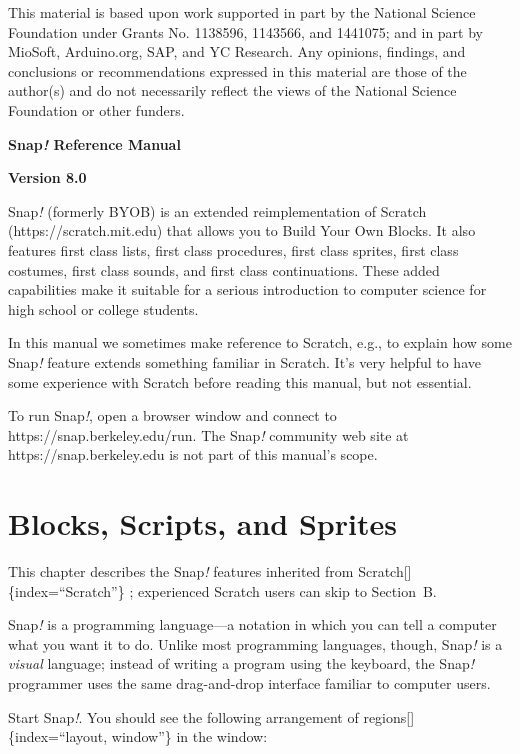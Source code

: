 \documentclass[
  letterpaper,
]{book}
\begin{document}
This material is based upon work supported in part by the National
Science Foundation under Grants No. 1138596, 1143566, and 1441075; and
in part by MioSoft, Arduino.org, SAP, and YC Research. Any opinions,
findings, and conclusions or recommendations expressed in this material
are those of the author(s) and do not necessarily reflect the views of
the National Science Foundation or other funders.

\textsc{\hfill\break
}\textbf{Snap\emph{!} Reference Manual}

\textbf{Version 8.0}

Snap\emph{!} (formerly BYOB) is an extended reimplementation of Scratch
(https://scratch.mit.edu) that allows you to Build Your Own Blocks. It
also features ﬁrst class lists, ﬁrst class procedures, first class
sprites, first class costumes, first class sounds, and first class
continuations. These added capabilities make it suitable for a serious
introduction to computer science for high school or college students.

In this manual we sometimes make reference to Scratch, e.g., to explain
how some Snap\emph{!} feature extends something familiar in Scratch.
It's very helpful to have some experience with Scratch before reading
this manual, but not essential.

To run Snap\emph{!}, open a browser window and connect to
https://snap.berkeley.edu/run. The Snap\emph{!} community web site at
https://snap.berkeley.edu is not part of this manual's scope.


\chapter{Blocks, Scripts, and Sprites}\label{blocks-scripts-and-sprites}

This chapter describes the Snap\emph{!} features inherited from
Scratch{[}{]}\{index=``Scratch''\} ; experienced Scratch users can skip
to Section~B.

Snap\emph{!} is a programming language---a notation in which you can
tell a computer what you want it to do. Unlike most programming
languages, though, Snap\emph{!} is a \emph{visual} language; instead of
writing a program using the keyboard, the Snap\emph{!} programmer uses
the same drag-and-drop interface familiar to computer users.

Start Snap\emph{!}. You should see the following arrangement of
regions{[}{]}\{index=``layout, window''\} in the window:
\end{document}
